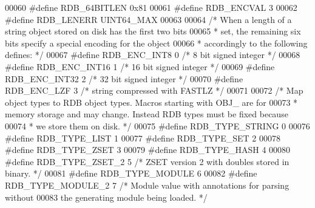 \begin{DoxyCode}
00060 \textcolor{preprocessor}{#}\textcolor{preprocessor}{define} \textcolor{preprocessor}{RDB\_64BITLEN} 0x81
00061 \textcolor{preprocessor}{#}\textcolor{preprocessor}{define} \textcolor{preprocessor}{RDB\_ENCVAL} 3
00062 \textcolor{preprocessor}{#}\textcolor{preprocessor}{define} \textcolor{preprocessor}{RDB\_LENERR} UINT64\_MAX
00063 
00064 \textcolor{comment}{/* When a length of a string object stored on disk has the first two bits}
00065 \textcolor{comment}{ * set, the remaining six bits specify a special encoding for the object}
00066 \textcolor{comment}{ * accordingly to the following defines: */}
00067 \textcolor{preprocessor}{#}\textcolor{preprocessor}{define} \textcolor{preprocessor}{RDB\_ENC\_INT8} 0        \textcolor{comment}{/* 8 bit signed integer */}
00068 \textcolor{preprocessor}{#}\textcolor{preprocessor}{define} \textcolor{preprocessor}{RDB\_ENC\_INT16} 1       \textcolor{comment}{/* 16 bit signed integer */}
00069 \textcolor{preprocessor}{#}\textcolor{preprocessor}{define} \textcolor{preprocessor}{RDB\_ENC\_INT32} 2       \textcolor{comment}{/* 32 bit signed integer */}
00070 \textcolor{preprocessor}{#}\textcolor{preprocessor}{define} \textcolor{preprocessor}{RDB\_ENC\_LZF} 3         \textcolor{comment}{/* string compressed with FASTLZ */}
00071 
00072 \textcolor{comment}{/* Map object types to RDB object types. Macros starting with OBJ\_ are for}
00073 \textcolor{comment}{ * memory storage and may change. Instead RDB types must be fixed because}
00074 \textcolor{comment}{ * we store them on disk. */}
00075 \textcolor{preprocessor}{#}\textcolor{preprocessor}{define} \textcolor{preprocessor}{RDB\_TYPE\_STRING} 0
00076 \textcolor{preprocessor}{#}\textcolor{preprocessor}{define} \textcolor{preprocessor}{RDB\_TYPE\_LIST}   1
00077 \textcolor{preprocessor}{#}\textcolor{preprocessor}{define} \textcolor{preprocessor}{RDB\_TYPE\_SET}    2
00078 \textcolor{preprocessor}{#}\textcolor{preprocessor}{define} \textcolor{preprocessor}{RDB\_TYPE\_ZSET}   3
00079 \textcolor{preprocessor}{#}\textcolor{preprocessor}{define} \textcolor{preprocessor}{RDB\_TYPE\_HASH}   4
00080 \textcolor{preprocessor}{#}\textcolor{preprocessor}{define} \textcolor{preprocessor}{RDB\_TYPE\_ZSET\_2} 5 \textcolor{comment}{/* ZSET version 2 with doubles stored in binary. */}
00081 \textcolor{preprocessor}{#}\textcolor{preprocessor}{define} \textcolor{preprocessor}{RDB\_TYPE\_MODULE} 6
00082 \textcolor{preprocessor}{#}\textcolor{preprocessor}{define} \textcolor{preprocessor}{RDB\_TYPE\_MODULE\_2} 7 \textcolor{comment}{/* Module value with annotations for parsing without}
00083 \textcolor{comment}{                               the generating module being loaded. */}

\end{DoxyCode}
